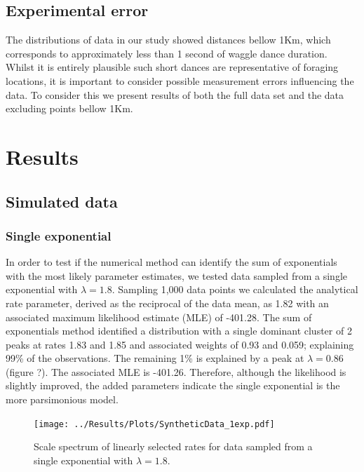 \documentclass[11pt,usenames,dvipsnames]{article}
\begin{document}
\subsection{Experimental error}

\begin{linenumbers}
\hspace{\parindent}
The distributions of data in our study showed distances bellow 1Km, which corresponds to approximately less than 1 second of waggle dance duration. Whilst it is entirely plausible such short dances are representative of foraging locations, it is important to consider possible measurement errors influencing the data. To consider this we present results of both the full data set and the data excluding points bellow 1Km. 
\end{linenumbers}
\section{Results}

\noindent
\subsection{Simulated data}

\subsubsection{Single exponential}

\begin{linenumbers}
\hspace{\parindent}
In order to test if the numerical method can identify the sum of exponentials with the most likely parameter estimates, we tested data sampled from a single exponential with $\lambda = 1.8$. Sampling 1,000 data points we calculated the analytical rate parameter, derived as the reciprocal of the data mean, as 1.82 with an associated maximum likelihood estimate (MLE) of -401.28. The sum of exponentials method identified a distribution with a single dominant cluster of 2 peaks at rates 1.83 and 1.85 and associated weights of 0.93 and 0.059; explaining 99\% of the observations. The remaining 1\% is explained by a peak at $\lambda = 0.86$ (figure ?). The associated MLE is -401.26. Therefore, although the likelihood is slightly improved, the added parameters indicate the single exponential is the more parsimonious model.
\end{linenumbers}
\begin{figure}[H]
	\centering
	\texttt{[image: ../Results/Plots/SyntheticData\_1exp.pdf]}
	\caption{Scale spectrum of linearly selected rates for data sampled from a single exponential with $\lambda = 1.8$.}
\end{figure}
\end{document}
